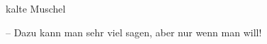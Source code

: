 


\pageref{lS44-1}
\begin{it}kalte Muschel\end{it} -- Dazu kann man sehr viel sagen, aber nur wenn
man will!
